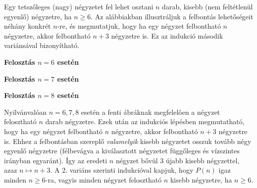 \begin{solution}
Egy tetszőleges (nagy) négyzetet fel lehet osztani $n$ darab, kisebb
(nem feltétlenül egyenlő) négyzetre, ha $n\ge6$. Az alábbiakban illusztráljuk
a felbontás lehetőségeit néhány konkrét $n$-re, és megmutatjuk, hogy
ha egy négyzet felbontható $n$ négyzetre, akkor felbontható $n+3$
négyzetre is. Ez az indukció második variánsával bizonyítható.
\begin{center}
\begin{minipage}[c]{0.3\textwidth}%
 \centering \textbf{Felosztás $n=6$ esetén}\\[5pt]  %
\end{minipage}\hspace{0.01\textwidth} %
\begin{minipage}[c]{0.3\textwidth}%
 \centering \textbf{Felosztás $n=7$ esetén}\\[5pt]  %
\end{minipage}\hspace{0.01\textwidth} %
\begin{minipage}[c]{0.3\textwidth}%
 \centering \textbf{Felosztás $n=8$ esetén}\\[5pt]  %
\end{minipage}
\par\end{center}
Nyilvánvalóan $n=6,7,8$ esetén a fenti ábráknak megfelelôen a négyzet
felosztható $n$ darab négyzetre. Ezek után az indukciós lépésben
megmutatható, hogy ha egy négyzet felbontható $n$ négyzetre, akkor
felbontható $n+3$ négyzetre is. Ehhez a felbontásban szereplő \emph{valamelyik}
kisebb négyzetet osszuk tovább négy egyenlő négyzetre (félbevágva
a kiválasztott négyzetet függőleges és vízszintes irányban egyaránt).
Így az eredeti $n$ négyzet bővül $3$ újabb kisebb négyzettel, azaz
$n\mapsto n+3$. A 2. variáns szerinti indukcióval kapjuk, hogy $P(n)$
igaz minden $n\ge6$-ra, vagyis minden négyzet felosztható $n$ kisebb
négyzetre, ha $n\ge6$.
\end{solution}
